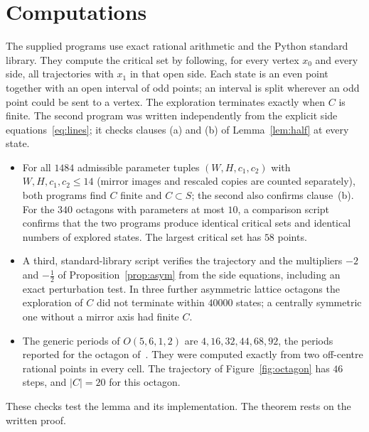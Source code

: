 \documentclass[11pt]{amsart}
\theoremstyle{definition}
\theoremstyle{remark}
\begin{document}
\section{Computations}\label{sec:computations}

The supplied programs use exact rational arithmetic and the Python standard library. They compute the critical set by following, for every vertex $x_0$ and every side, all trajectories with $x_1$ in that open side. Each state is an even point together with an open interval of odd points; an interval is split wherever an odd point could be sent to a vertex. The exploration terminates exactly when $C$ is finite. The second program was written independently from the explicit side equations~\eqref{eq:lines}; it checks clauses (a) and (b) of Lemma~\ref{lem:half} at every state.

\begin{itemize}
\item For all $1484$ admissible parameter tuples $(W,H,c_1,c_2)$ with $W,H,c_1,c_2\le14$ (mirror images and rescaled copies are counted separately), both programs find $C$ finite and $C\subset S$; the second also confirms clause~(b). For the $340$ octagons with parameters at most $10$, a comparison script confirms that the two programs produce identical critical sets and identical numbers of explored states. The largest critical set has $58$ points.
\item A third, standard-library script verifies the trajectory and the multipliers $-2$ and $-\frac12$ of Proposition~\ref{prop:asym} from the side equations, including an exact perturbation test. In three further asymmetric lattice octagons the exploration of $C$ did not terminate within $40000$ states; a centrally symmetric one without a mirror axis had finite $C$.
\item The generic periods of $O(5,6,1,2)$ are $4,16,32,44,68,92$, the periods reported for the octagon of~\cite[Figure~23]{ABS25}. They were computed exactly from two off-centre rational points in every cell. The trajectory of Figure~\ref{fig:octagon} has $46$ steps, and $|C|=20$ for this octagon.
\end{itemize}

These checks test the lemma and its implementation. The theorem rests on the written proof.
\end{document}

